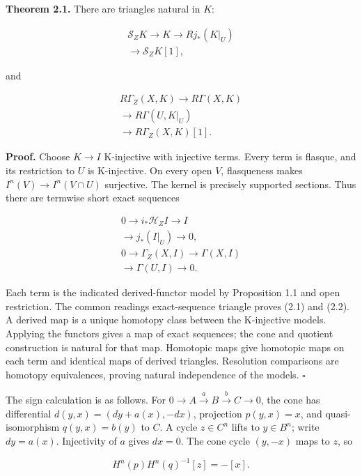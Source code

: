 \documentclass[
  english,
  11pt,
  a4paper,
]{article}
\begin{document}
\textbf{Theorem 2.1.} There are triangles natural in \(K\):

\[\begin{gathered}
\mathcal S_ZK\longrightarrow K\longrightarrow Rj_*(K|_U)\\
\longrightarrow\mathcal S_ZK[1],
\end{gathered}
\tag{2.1}\]

and

\[\begin{gathered}
R\Gamma_Z(X,K)\longrightarrow R\Gamma(X,K)\\
\longrightarrow R\Gamma(U,K|_U)\\
\longrightarrow R\Gamma_Z(X,K)[1].
\end{gathered}
\tag{2.2}\]

\textbf{Proof.} Choose \(K\to I\) K-injective with injective terms.
Every term is flasque, and its restriction to \(U\) is K-injective. On
every open \(V\), flasqueness makes \(I^n(V)\to I^n(V\cap U)\)
surjective. The kernel is precisely supported sections. Thus there are
termwise short exact sequences

\[\begin{gathered}
0\to i_*\mathcal H_ZI\to I\\
\to j_*(I|_U)\to0,\\[4pt]
0\to\Gamma_Z(X,I)\to\Gamma(X,I)\\
\to\Gamma(U,I)\to0.
\end{gathered}
\tag{2.3}\]

Each term is the indicated derived-functor model by Proposition 1.1 and
open restriction. The common reading\textquotesingle s exact-sequence
triangle proves (2.1) and (2.2). A derived map is a unique homotopy
class between the K-injective models. Applying the functors gives a map
of exact sequences; the cone and quotient construction is natural for
that map. Homotopic maps give homotopic maps on each term and identical
maps of derived triangles. Resolution comparisons are homotopy
equivalences, proving natural independence of the models. \(\square\)

The sign calculation is as follows. For
\(0\to A\xrightarrow{a}B\xrightarrow{b}C\to0\), the cone has
differential \(d(y,x)=(dy+a(x),-dx)\), projection \(p(y,x)=x\), and
quasi-isomorphism \(q(y,x)=b(y)\) to \(C\). A cycle \(z\in C^n\) lifts
to \(y\in B^n\); write \(dy=a(x)\). Injectivity of \(a\) gives \(dx=0\).
The cone cycle \((y,-x)\) maps to \(z\), so

\[H^n(p)H^n(q)^{-1}[z]=-[x].
\tag{2.4}\]
\end{document}
